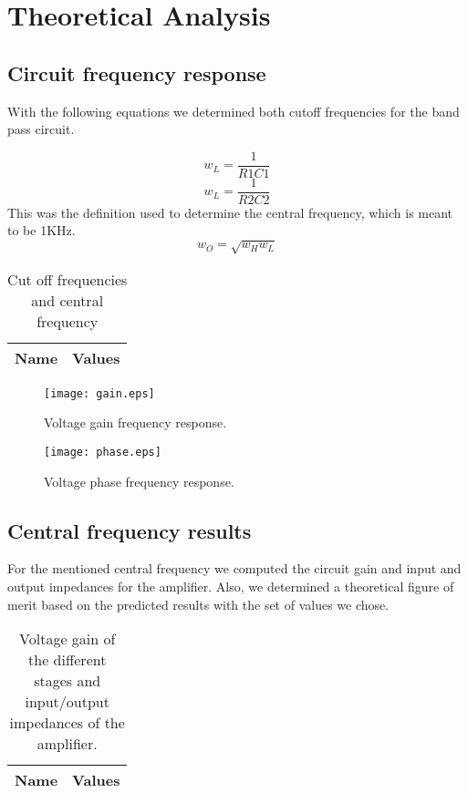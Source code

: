 \section{Theoretical Analysis}
\label{sec:analysis}
\subsection{Circuit frequency response}
With the following equations we determined both cutoff frequencies for the band pass circuit. 

\begin{equation}
w_L=\frac{1}{R1C1}
\end{equation}
\begin{equation}
w_L=\frac{1}{R2C2}
\end{equation}
This was the definition used to determine the central frequency, which is meant to be 1KHz.
\begin{equation}
w_O=\sqrt{w_{H}w_{L}}
\end{equation}

\begin{table}[h!]
  \centering
  \begin{tabular}{|l|r|}
    \hline    
    {\bf Name} & {\bf Values} \\ \hline
     
  \end{tabular}
  \caption{Cut off frequencies and central frequency}
  \label{tab:data}
\end{table}

\begin{figure}[!h] \centering
\texttt{[image: gain.eps]}
\caption{Voltage gain frequency response.}
\label{fig:gainfreq}
\end{figure}

\begin{figure}[!h] \centering
\texttt{[image: phase.eps]}
\caption{Voltage phase frequency response.}
\label{fig:gainfreq}
\end{figure}

\subsection{Central frequency results}
For the mentioned central frequency we computed the circuit gain and input and output impedances for the amplifier. Also, we determined a theoretical figure of merit based on the predicted results with the set of values we chose.
\begin{table}[h!]
  \centering
  \begin{tabular}{|l|r|}
    \hline    
    {\bf Name} & {\bf Values} \\ \hline
     
  \end{tabular}
  \caption{Voltage gain of the different stages and input/output impedances of the amplifier.}
  \label{tab:data}
\end{table}
